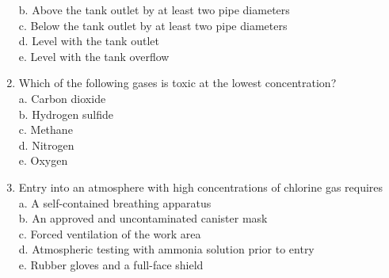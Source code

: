 \documentclass{article}
\begin{document}
\begin{enumerate}
b. Above the tank outlet by at least two pipe diameters\\
c. Below the tank outlet by at least two pipe diameters\\
d. Level with the tank outlet\\
e. Level with the tank overflow\\
  \item Which of the following gases is toxic at the lowest concentration?\\
a. Carbon dioxide\\
b. Hydrogen sulfide\\
c. Methane\\
d. Nitrogen\\
e. Oxygen\\
  \item Entry into an atmosphere with high concentrations of chlorine gas requires\\
a. A self-contained breathing apparatus\\
b. An approved and uncontaminated canister mask\\
c. Forced ventilation of the work area\\
d. Atmospheric testing with ammonia solution prior to entry\\
e. Rubber gloves and a full-face shield


\end{enumerate}
\end{document}
